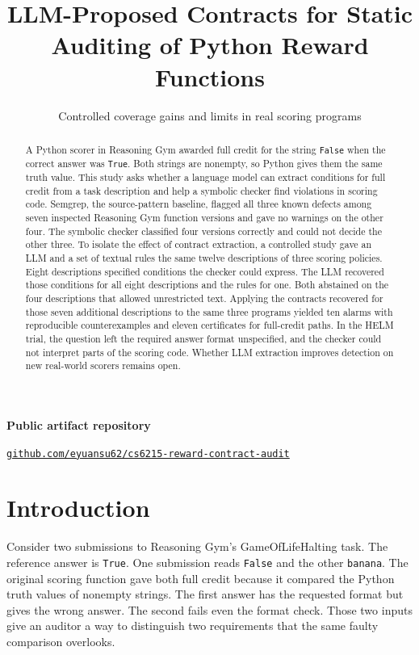 \documentclass[sigconf]{acmart}
\title{LLM-Proposed Contracts for Static Auditing of Python Reward Functions}
\subtitle{Controlled coverage gains and limits in real scoring programs}
\author{\texorpdfstring{\blankfield}{}}
\affiliation{\institution{School of Computing, National University of Singapore}\city{Singapore}\country{Singapore}}
\begin{document}
\begin{abstract}
A Python scorer in Reasoning Gym awarded full credit for the string \texttt{False} when the correct answer was \texttt{True}. Both strings are nonempty, so Python gives them the same truth value. This study asks whether a language model can extract conditions for full credit from a task description and help a symbolic checker find violations in scoring code. Semgrep, the source-pattern baseline, flagged all three known defects among seven inspected Reasoning Gym function versions and gave no warnings on the other four. The symbolic checker classified four versions correctly and could not decide the other three. To isolate the effect of contract extraction, a controlled study gave an LLM and a set of textual rules the same twelve descriptions of three scoring policies. Eight descriptions specified conditions the checker could express. The LLM recovered those conditions for all eight descriptions and the rules for one. Both abstained on the four descriptions that allowed unrestricted text. Applying the contracts recovered for those seven additional descriptions to the same three programs yielded ten alarms with reproducible counterexamples and eleven certificates for full-credit paths. In the HELM trial, the question left the required answer format unspecified, and the checker could not interpret parts of the scoring code. Whether LLM extraction improves detection on new real-world scorers remains open.
\end{abstract}
\maketitle

\noindent\textbf{Public artifact repository}\par\noindent\href{https://github.com/eyuansu62/cs6215-reward-contract-audit}{\nolinkurl{github.com/eyuansu62/cs6215-reward-contract-audit}}

\section{Introduction}

Consider two submissions to Reasoning Gym's GameOfLifeHalting task. The reference answer is \texttt{True}. One submission reads \texttt{False} and the other \texttt{banana}. The original scoring function gave both full credit because it compared the Python truth values of nonempty strings. The first answer has the requested format but gives the wrong answer. The second fails even the format check. Those two inputs give an auditor a way to distinguish two requirements that the same faulty comparison overlooks.
\end{document}

